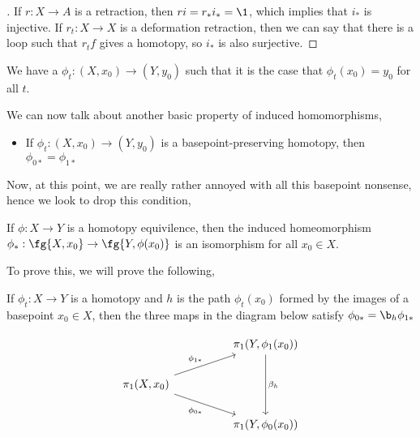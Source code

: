 \begin{proof}[]
  If $r : X \to A$ is a retraction, then $ri = r_*i_* = \1$, which implies that $i_*$ is injective. If $r_t : X \to X$ is a deformation retraction, then we can say that there is a loop such that $r_t f$ gives a homotopy, so $i_*$ is also surjective.
\end{proof}

\begin{ndefi}
  We have a $\phi_t : (X, x_0) \to (Y, y_0)$ such that it is the case that $\phi_t (x_0) = y_0$ for all $t$.
\end{ndefi}

\begin{pprop}
  We can now talk about another basic property of induced homomorphisms,
  \begin{itemize}
    \item If $\phi_t : (X, x_0) \to (Y, y_0)$ is a basepoint-preserving homotopy, then $\phi_{0*} = \phi_{1*}$
  \end{itemize}
\end{pprop}

Now, at this point, we are really rather annoyed with all this basepoint nonsense, hence we look to drop this condition,

\begin{nprop}
  If $\phi : X\to Y$ is a homotopy equivilence, then the induced homeomorphism $\phi_* : \fg { X, x_0} \to \fg {Y, \phi (x_0)}$ is an isomorphism for all $x_0 \in X$.
\end{nprop}
To prove this, we will prove the following,
\begin{nlemma}[]
  If $\phi_t : X \to Y$ is a homotopy and $h$ is the path $\phi_t(x_0)$ formed by the images of a basepoint $x_0\in X$, then the three maps in the diagram below satisfy $\phi_{0*} = \b_h \phi_{1*}$
\end{nlemma}

\[\begin{tikzcd}
	&& {\pi_1 (Y, \phi_1(x_0))} \\
	{\pi_1 (X, x_0)} \\
	&& {\pi_1 (Y, \phi_0(x_0))}
	\arrow["{\phi_{1*}}", from=2-1, to=1-3]
	\arrow["{\phi_{0*}}"', from=2-1, to=3-3]
	\arrow["{\beta_h}", from=1-3, to=3-3]
\end{tikzcd}\]
